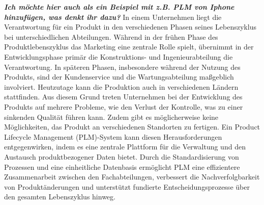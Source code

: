 \documentclass[a4paper, 12pt]{scrartcl}
\begin{document}
	\textbf{\textit{Ich möchte hier auch als ein Beispiel mit z.B. PLM von Iphone hinzufügen, was denkt ihr dazu?}}
	\newline 
	\newline
In einem Unternehmen liegt die Verantwortung für ein Produkt in den verschiedenen Phasen seines Lebenszyklus bei unterschiedlichen Abteilungen. Während in der frühen Phase des Produktlebenszyklus das Marketing eine zentrale Rolle spielt, übernimmt in der Entwicklungsphase primär die Konstruktions- und Ingenieurabteilung die Verantwortung. In späteren Phasen, insbesondere während der Nutzung des Produkts, sind der Kundenservice und die Wartungsabteilung maßgeblich involviert. Heutzutage kann die Produktion auch in verschiedenen Ländern stattfinden.\newline
Aus diesem Grund treten Unternehmen bei der Entwicklung des Produkts auf mehrere Probleme, wie den Verlust der Kontrolle, was zu einer sinkenden Qualität führen kann. Zudem gibt es möglicherweise keine Möglichkeiten, das Produkt an verschiedenen Standorten zu fertigen\cite{stark2011product}.\newline
Ein Product Lifecycle Management (PLM)-System kann diesen Herausforderungen entgegenwirken, indem es eine zentrale Plattform für die Verwaltung und den Austausch produktbezogener Daten bietet. Durch die Standardisierung von Prozessen und eine einheitliche Datenbasis ermöglicht PLM eine effizientere Zusammenarbeit zwischen den Fachabteilungen, verbessert die Nachverfolgbarkeit von Produktänderungen und unterstützt fundierte Entscheidungsprozesse über den gesamten Lebenszyklus hinweg\cite{ozturk2019product}.
\end{document}
